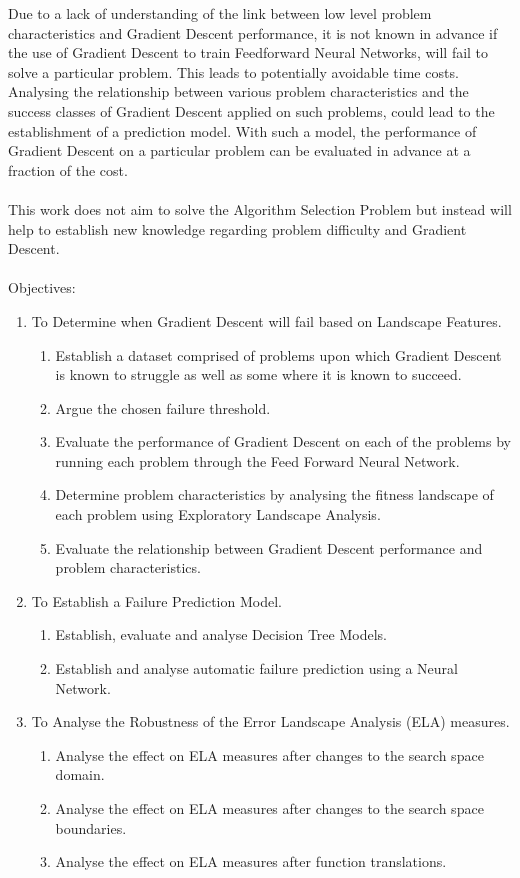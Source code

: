 \documentclass[runningheads,a4paper]{llncs}
\begin{document}
Due to a lack of understanding of the link between low level problem characteristics and Gradient Descent performance, 
it is not known in advance if the use of Gradient Descent to train Feedforward Neural Networks, will fail to solve a particular problem. 
This leads to potentially avoidable time costs.
Analysing the relationship between various problem characteristics and the success classes of Gradient Descent applied on such problems, 
could lead to the establishment of a prediction model. With such a model, the performance of Gradient Descent on a particular problem can be 
evaluated in advance at a fraction of the cost.
\\\\
This work does not aim to solve the Algorithm Selection Problem but instead will help to establish new knowledge regarding problem difficulty and
Gradient Descent.
\\\\
Objectives:
\begin{enumerate}
 \item To Determine when Gradient Descent will fail based on Landscape Features.
 \begin{enumerate}
  \item Establish a dataset comprised of problems upon which Gradient Descent is known to struggle as well as some where it is known to succeed.
  \item Argue the chosen failure threshold. 
  \item Evaluate the performance of Gradient Descent on each of the problems by running each problem through the Feed Forward Neural Network.
  \item Determine problem characteristics by analysing the fitness landscape of each problem using Exploratory Landscape Analysis.
  \item Evaluate the relationship between Gradient Descent performance and problem characteristics.
 \end{enumerate}
 
 \item To Establish a Failure Prediction Model.
 \begin{enumerate}
  \item Establish, evaluate and analyse Decision Tree Models.
  \item Establish and analyse automatic failure prediction using a Neural Network.
 \end{enumerate}
 
 \item To Analyse the Robustness of the Error Landscape Analysis (ELA) measures.
 \begin{enumerate}
  \item Analyse the effect on ELA measures after changes to the search space domain.
  \item Analyse the effect on ELA measures after changes to the search space boundaries.
  \item Analyse the effect on ELA measures after function translations.
 \end{enumerate}
 
\end{enumerate}
\end{document}

